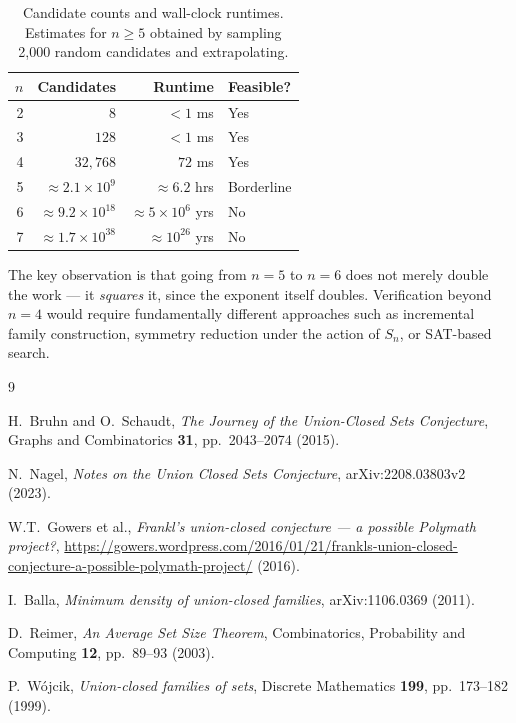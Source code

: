 \documentclass[11pt]{article}
\theoremstyle{definition}
\theoremstyle{remark}
\begin{document}
\begin{table}[h]
\centering
\begin{tabular}{rrrl}
\hline
$n$ & Candidates & Runtime & Feasible? \\
\hline
2 & $8$ & $< 1$ ms & Yes \\
3 & $128$ & $< 1$ ms & Yes \\
4 & $32{,}768$ & $72$ ms & Yes \\
5 & $\approx 2.1 \times 10^{9}$ & $\approx 6.2$ hrs & Borderline \\
6 & $\approx 9.2 \times 10^{18}$ & $\approx 5 \times 10^{6}$ yrs & No \\
7 & $\approx 1.7 \times 10^{38}$ & $\approx 10^{26}$ yrs & No \\
\hline
\end{tabular}
\caption{Candidate counts and wall-clock runtimes. Estimates for $n \ge 5$
obtained by sampling 2,000 random candidates and extrapolating.}
\label{tab:timing}
\end{table}

The key observation is that going from $n=5$ to $n=6$ does not merely
double the work --- it \emph{squares} it, since the exponent itself doubles.
Verification beyond $n=4$ would require fundamentally different approaches
such as incremental family construction, symmetry reduction under the
action of $S_n$, or SAT-based search.

\begin{thebibliography}{9}

H.~Bruhn and O.~Schaudt,
\textit{The Journey of the Union-Closed Sets Conjecture},
Graphs and Combinatorics \textbf{31}, pp.~2043--2074 (2015).

N.~Nagel,
\textit{Notes on the Union Closed Sets Conjecture},
arXiv:2208.03803v2 (2023).

W.T.~Gowers et al.,
\textit{Frankl's union-closed conjecture --- a possible Polymath project?},
\url{https://gowers.wordpress.com/2016/01/21/frankls-union-closed-conjecture-a-possible-polymath-project/} (2016).

I.~Balla,
\textit{Minimum density of union-closed families},
arXiv:1106.0369 (2011).

D.~Reimer,
\textit{An Average Set Size Theorem},
Combinatorics, Probability and Computing \textbf{12}, pp.~89--93 (2003).

P.~W\'{o}jcik,
\textit{Union-closed families of sets},
Discrete Mathematics \textbf{199}, pp.~173--182 (1999).

\end{thebibliography}
\end{document}
